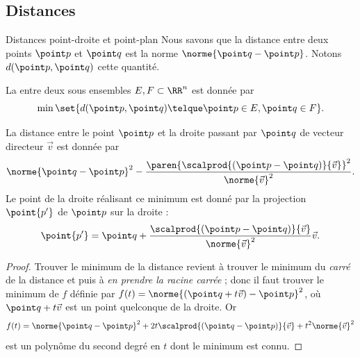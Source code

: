   \subsection{Distances}
\begin{frame}{Distances point-droite et point-plan}
\label{sec:distances}
Nous savons que la distance entre deux points \(\point p\) et \(\point q\) est la norme \(\norme{\point q - \point p}\). Notons \(d(\point p, \point q)\) cette quantité.

\begin{definition}
  La  entre deux sous ensembles \(E,F\subset \RR^{n}\) est donnée par
  \begin{equation*}
    \min \set{ d(\point p, \point q) \telque \point p\in E, \point q \in F}.
  \end{equation*}
\end{definition}

\end{frame}
\begin{frame}
\begin{proposition}
  La distance entre le point \(\point p\) et la droite passant par \(\point q\) de vecteur directeur \(\vec v\) est donnée par
  \begin{equation*}
    \norme{\point q - \point p}^{2} -  \frac{\paren{\scalprod{(\point p - \point q)}{\vec v}}^{2}}{\norme{\vec v}^{2}}.
  \end{equation*}\pause
  Le point de la droite réalisant ce minimum est donné par la projection \(\point {p'}\) de \(\point p\) sur la droite :
  \begin{equation*}
    \point {p'} = \point q + \frac{\scalprod{(\point p - \point q)}{\vec v}}{\norme{\vec v}^{2}} \vec v.
  \end{equation*}
\end{proposition}
\begin{proof}
 Trouver le minimum de la distance revient à trouver le minimum du \emph{carré} de la distance et puis à \emph{en prendre la racine carrée} ; donc il faut trouver le minimum de \(f\) définie par \(f(t) = \norme{(\point q + t \vec v) - \point p}^{2}\), où \(\point q + t \vec v\) est un point quelconque de la droite. Or
  \begin{equation*}
    f(t) = \norme{\point q - \point p}^{2} + 2 t \scalprod{(\point q - \point p)}{\vec v} + t^{2} \norme{\vec v}^{2}
  \end{equation*}
  est un polynôme du second degré en \(t\) dont le minimum est connu.%
\end{proof}
\end{frame}

